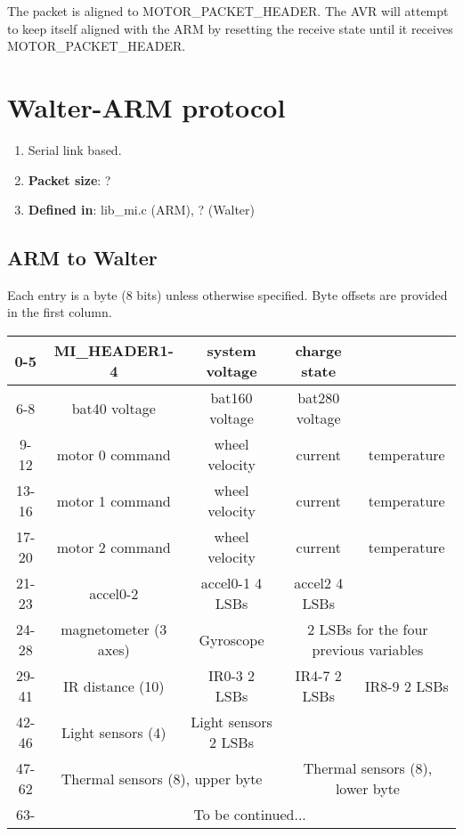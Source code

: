 \documentclass[12pt]{article}
\newcommand{\kw}[1]{\textbf{#1}}
\begin{document}
The packet is aligned to MOTOR\_PACKET\_HEADER. The AVR will attempt to keep itself aligned with
the ARM by resetting the receive state until it receives MOTOR\_PACKET\_HEADER.


\section{Walter-ARM protocol}

\begin{enumerate}
  \item{Serial link based.}
  \item{\kw{Packet size}: ?} 
  \item{\kw{Defined in}: lib\_mi.c (ARM), ? (Walter)}
\end{enumerate}

\subsection{ARM to Walter}

Each entry is a byte (8 bits) unless otherwise specified. Byte offsets are provided in the first 
column. 

\begin{center}
\begin{tabular}{|c||c|c|c|c|}
\hline
0-5 & MI\_HEADER1-4 & system voltage & charge state & \\
\hline
6-8 & bat40 voltage & bat160 voltage & bat280 voltage & \\
\hline
\hline
9-12 & motor 0 command & wheel velocity & current & temperature \\
13-16 & motor 1 command & wheel velocity & current & temperature \\
17-20 & motor 2 command & wheel velocity & current & temperature \\
\hline
\hline
21-23 & accel0-2 & accel0-1 4 LSBs & accel2 4 LSBs & \\
\hline
24-28 & magnetometer (3 axes) & Gyroscope & \multicolumn{2}{c|}{2 LSBs for the four previous variables} \\
\hline
29-41 & IR distance (10) & IR0-3 2 LSBs & IR4-7 2 LSBs & IR8-9 2 LSBs \\
\hline
42-46 & Light sensors (4) & Light sensors 2 LSBs & & \\
\hline
47-62 & \multicolumn{2}{c|}{Thermal sensors (8), upper byte} & \multicolumn{2}{c|}{Thermal sensors (8), lower byte} \\
\hline
63- & \multicolumn{4}{c|}{To be continued...} \\
\hline
\end{tabular}
\end{center}
\end{document}
